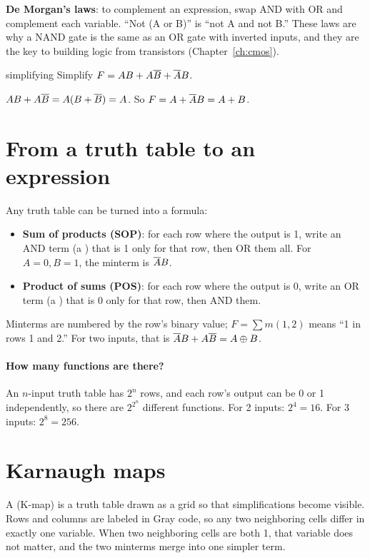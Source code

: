 \begin{bigidea}
\textbf{De Morgan's laws}: to complement an expression, swap AND with OR and complement each variable. ``Not (A or B)'' is ``not A and not B.'' These laws are why a NAND gate is the same as an OR gate with inverted inputs, and they are the key to building logic from transistors (Chapter~\ref{ch:cmos}).
\end{bigidea}

\begin{worked}{simplifying}
Simplify $F = AB + A\overline{B} + \overline{A}B$.

$AB + A\overline{B} = A(B + \overline{B}) = A$. So $F = A + \overline{A}B = A + B$.
\end{worked}

\section{From a truth table to an expression}

Any truth table can be turned into a formula:

\begin{itemize}
  \item \textbf{Sum of products (SOP)}: for each row where the output is 1, write an AND term (a ) that is 1 only for that row, then OR them all. For $A=0, B=1$, the minterm is $\overline{A}B$.
  \item \textbf{Product of sums (POS)}: for each row where the output is 0, write an OR term (a ) that is 0 only for that row, then AND them.
\end{itemize}

Minterms are numbered by the row's binary value; $F = \sum m(1,2)$ means ``1 in rows 1 and 2.'' For two inputs, that is $\overline{A}B + A\overline{B} = A \oplus B$.

\paragraph{How many functions are there?} An $n$-input truth table has $2^n$ rows, and each row's output can be 0 or 1 independently, so there are $2^{2^n}$ different functions. For 2 inputs: $2^4 = 16$. For 3 inputs: $2^8 = 256$.

\section{Karnaugh maps}

A  (K-map) is a truth table drawn as a grid so that simplifications become visible. Rows and columns are labeled in Gray code, so any two neighboring cells differ in exactly one variable. When two neighboring cells are both 1, that variable does not matter, and the two minterms merge into one simpler term.

